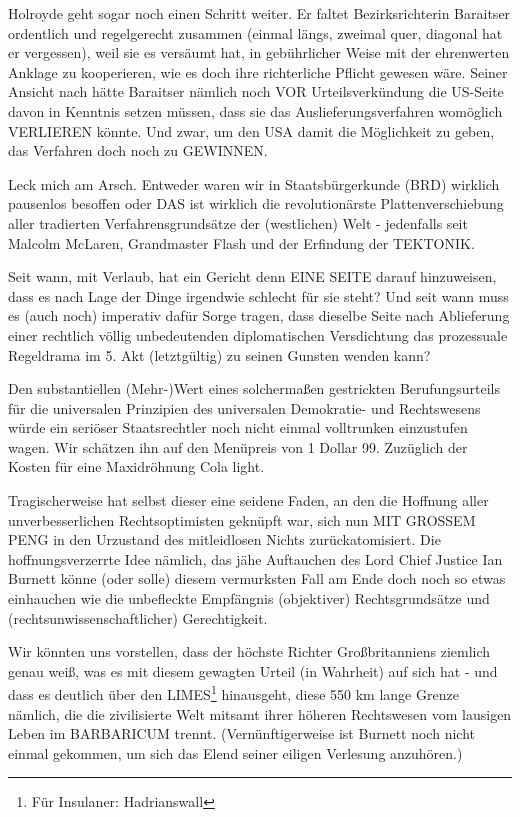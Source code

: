 \begin{multicols}{2}
Holroyde geht sogar noch einen Schritt weiter. Er faltet
Bezirksrichterin Baraitser ordentlich und regelgerecht
zusammen (einmal längs, zweimal quer, diagonal hat er
vergessen), weil sie es versäumt hat, in gebührlicher Weise mit der ehrenwerten Anklage zu kooperieren, wie es
doch ihre richterliche Pflicht gewesen wäre. Seiner Ansicht nach hätte Baraitser nämlich noch VOR Urteilsverkündung die US-Seite davon in Kenntnis setzen müssen,
dass sie das Auslieferungsverfahren womöglich VERLIEREN könnte. Und zwar, um den USA damit die Möglichkeit zu geben, das Verfahren doch noch zu GEWINNEN.

Leck mich am Arsch. Entweder waren wir in Staatsbürgerkunde (BRD) wirklich pausenlos besoffen oder DAS
ist wirklich die revolutionärste Plattenverschiebung aller
tradierten Verfahrensgrundsätze der (westlichen) Welt
- jedenfalls seit Malcolm McLaren, Grandmaster Flash
und der Erfindung der TEKTONIK.

Seit wann, mit Verlaub, hat ein Gericht denn EINE SEITE
darauf hinzuweisen, dass es nach Lage der Dinge irgendwie schlecht für sie steht? Und seit wann muss es (auch
noch) imperativ dafür Sorge tragen, dass dieselbe Seite
nach Ablieferung einer rechtlich völlig unbedeutenden
diplomatischen Versdichtung das prozessuale Regeldrama im 5. Akt (letztgültig) zu seinen Gunsten wenden
kann?

Den substantiellen (Mehr-)Wert eines solchermaßen gestrickten Berufungsurteils für die universalen Prinzipien
des universalen Demokratie- und Rechtswesens würde
ein seriöser Staatsrechtler noch nicht einmal volltrunken einzustufen wagen. Wir schätzen ihn auf den Menüpreis von 1 Dollar 99. Zuzüglich der Kosten für eine
Maxidröhnung Cola light.

Tragischerweise hat selbst dieser eine seidene Faden,
an den die Hoffnung aller unverbesserlichen Rechtsoptimisten geknüpft war, sich nun MIT GROSSEM PENG
in den Urzustand des mitleidlosen Nichts zurückatomisiert. Die hoffnungsverzerrte Idee nämlich, das jähe Auftauchen des Lord Chief Justice Ian Burnett könne (oder
solle) diesem vermurksten Fall am Ende doch noch so
etwas einhauchen wie die unbefleckte Empfängnis (objektiver) Rechtsgrundsätze und (rechtsunwissenschaftlicher) Gerechtigkeit.

Wir könnten uns vorstellen, dass der höchste Richter
Großbritanniens ziemlich genau weiß, was es mit diesem gewagten Urteil (in Wahrheit) auf sich hat - und
dass es deutlich über den LIMES\footnote[33]{Für Insulaner: Hadrianswall} hinausgeht, diese 550
km lange Grenze nämlich, die die zivilisierte Welt mitsamt ihrer höheren Rechtswesen vom lausigen Leben
im BARBARICUM trennt. (Vernünftigerweise ist Burnett
noch nicht einmal gekommen, um sich das Elend seiner
eiligen Verlesung anzuhören.)


\end{multicols}
